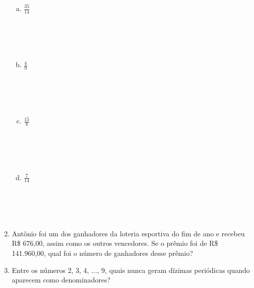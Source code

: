 \documentclass[a4paper,14pt]{article}
\begin{document}
\begin{multicols}{2}
\begin{enumerate}
\begin{enumerate}[a)]
   				\item $\frac{35}{14}$ \\\\\\\\\\
   				\item $\frac{4}{9}$ \\\\\\\\\\
   				\item $\frac{15}{8}$ \\\\\\\\\\
   				\item $\frac{7}{14}$ \\\\\\\\\\
   			\end{enumerate}
   			\item Antônio foi um dos ganhadores da loteria esportiva do fim de ano e recebeu R\$ 676,00, assim como os outros vencedores. Se o prêmio foi de R\$ 141.960,00, qual foi o número de ganhadores desse prêmio? \newpage
   			\item Entre os números 2, 3, 4, ..., 9, quais nunca geram dízimas periódicas quando aparecem como denominadores?
   		\end{enumerate}

\end{multicols}
\end{document}
